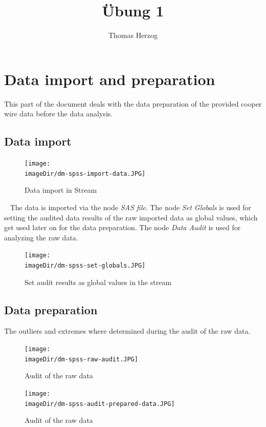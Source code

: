 \documentclass[11pt, a4paper, twoside]{article}   	%
\title{Übung 1}
\author{Thomas Herzog}
\newcommand{\imageDir}{./images/}
\begin{document}
\setlength{\headheight}{15mm}
%

\section{Data import and preparation}
This part of the document deals with the data preparation of the provided cooper wire data before the data analysis.

\subsection{Data import}

\begin{figure}[h]
\centering
\texttt{[image: \\imageDir/dm-spss-import-data.JPG]}
\caption{Data import in Stream}
\end{figure}
\ \newline
The data is imported via the node \emph{SAS file}. The node \emph{Set Globals} is used for setting the audited data results of the raw imported data as global values, which get used later on for the data preparation. The node \emph{Data Audit} is used for analyzing the raw data.

\begin{figure}[h]
\centering
\texttt{[image: \\imageDir/dm-spss-set-globals.JPG]}
\caption{Set audit results as global values in the stream}
\end{figure}
\subsection{Data preparation}
The outliers and extremes where determined during the audit of the raw data.
\begin{figure}[h]
\centering
\texttt{[image: \\imageDir/dm-spss-raw-audit.JPG]}
\caption{Audit of the raw data}
\label{fig:raw-data-audit}
\end{figure}
\begin{figure}[h]
\centering
\texttt{[image: \\imageDir/dm-spss-audit-prepared-data.JPG]}
\caption{Audit of the raw data}
\end{figure}
\ \newpage
\end{document}
